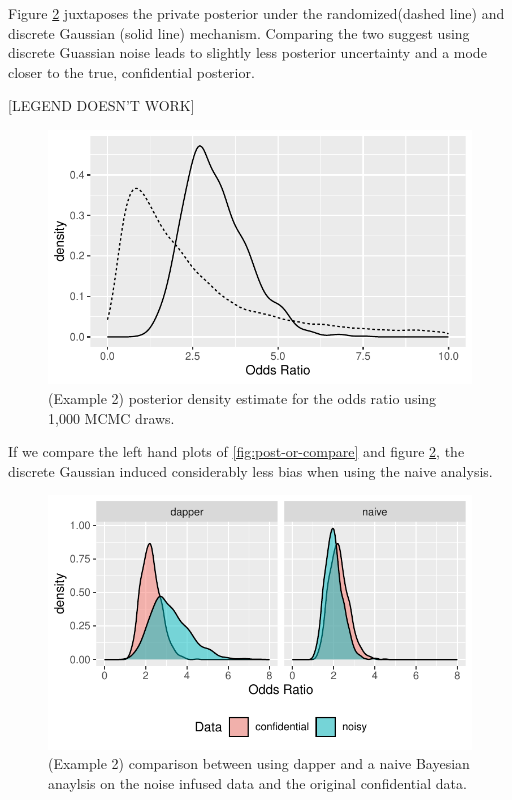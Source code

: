 Figure \ref{fig:post-or-compare-dg} juxtaposes the private posterior under the
randomized(dashed line) and discrete Gaussian (solid line) mechanism. Comparing
the two suggest using discrete Guassian noise leads to slightly less
posterior uncertainty and a mode closer to the true, confidential posterior.

{[}LEGEND DOESN'T WORK{]}

\begin{figure}

{\centering \includegraphics{dppaper_files/figure-latex/post-or-density-dg-1} 

}

\caption{(Example 2) posterior density estimate for the odds ratio using 1,000 MCMC draws.}\label{fig:post-or-density-dg}
\end{figure}

If we compare the left hand plots of
\ref{fig:post-or-compare} and figure \ref{fig:post-or-compare-dg},
the discrete Gaussian induced considerably less bias when using the naive analysis.

\begin{figure}

{\centering \includegraphics{dppaper_files/figure-latex/post-or-compare-dg-1} 

}

\caption{(Example 2) comparison between using dapper and a naive Bayesian anaylsis on the
noise infused data and the original confidential data.}\label{fig:post-or-compare-dg}
\end{figure}

